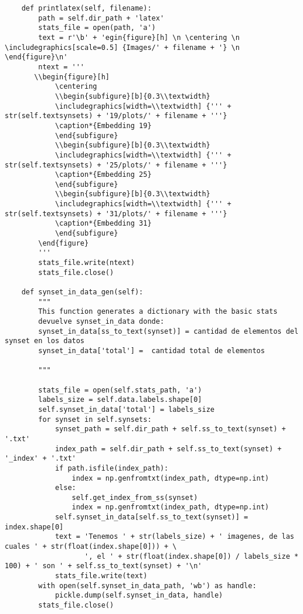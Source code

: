 \documentclass[12,twoside]{TFG-GM}
\theoremstyle{definition}
\theoremstyle{remark}
\begin{document}
\begin{verbatim}
    def printlatex(self, filename):
        path = self.dir_path + 'latex'
        stats_file = open(path, 'a')
        text = r'\b' + 'egin{figure}[h] \n \centering \n \includegraphics[scale=0.5] {Images/' + filename + '} \n \end{figure}\n'
        ntext = '''
       \\begin{figure}[h] 
            \centering
            \\begin{subfigure}[b]{0.3\\textwidth}
            \includegraphics[width=\\textwidth] {''' + str(self.textsynsets) + '19/plots/' + filename + '''}
            \caption*{Embedding 19}
            \end{subfigure}
            \\begin{subfigure}[b]{0.3\\textwidth}
            \includegraphics[width=\\textwidth] {''' + str(self.textsynsets) + '25/plots/' + filename + '''}
            \caption*{Embedding 25}
            \end{subfigure}
            \\begin{subfigure}[b]{0.3\\textwidth}
            \includegraphics[width=\\textwidth] {''' + str(self.textsynsets) + '31/plots/' + filename + '''}
            \caption*{Embedding 31}
            \end{subfigure}       
        \end{figure}
        '''
        stats_file.write(ntext)
        stats_file.close()

    def synset_in_data_gen(self):
        """
        This function generates a dictionary with the basic stats
        devuelve synset_in_data donde:
        synset_in_data[ss_to_text(synset)] = cantidad de elementos del synset en los datos
        synset_in_data['total'] =  cantidad total de elementos

        """

        stats_file = open(self.stats_path, 'a')
        labels_size = self.data.labels.shape[0]
        self.synset_in_data['total'] = labels_size
        for synset in self.synsets:
            synset_path = self.dir_path + self.ss_to_text(synset) + '.txt'
            index_path = self.dir_path + self.ss_to_text(synset) + '_index' + '.txt'
            if path.isfile(index_path):
                index = np.genfromtxt(index_path, dtype=np.int)
            else:
                self.get_index_from_ss(synset)
                index = np.genfromtxt(index_path, dtype=np.int)
            self.synset_in_data[self.ss_to_text(synset)] = index.shape[0]
            text = 'Tenemos ' + str(labels_size) + ' imagenes, de las cuales ' + str(float(index.shape[0])) + \
                   ', el ' + str(float(index.shape[0]) / labels_size * 100) + ' son ' + self.ss_to_text(synset) + '\n'
            stats_file.write(text)
        with open(self.synset_in_data_path, 'wb') as handle:
            pickle.dump(self.synset_in_data, handle)
        stats_file.close()


\end{verbatim}
\end{document}
